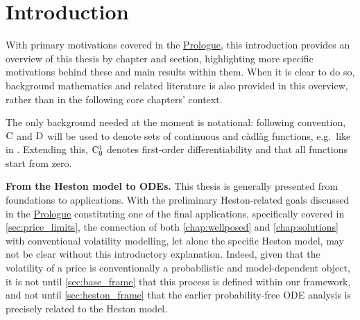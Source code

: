 \clearpage

\setlength{\headsep}{10mm}

\pagestyle{fancy}
\fancyhf{}
\renewcommand{\headrulewidth}{0pt}
\cfoot{\thepage}
\chead{\textsc{\nouppercase{\leftmark}}}

\section{Introduction}\label{ch:intro}

With primary motivations covered in the \hyperlink{prologue}{Prologue}, this introduction provides an overview of this thesis by chapter and section, highlighting more specific motivations behind these and main results within them. When it is clear to do so, background mathematics and related literature is also provided in this overview, rather than in the following core chapters' context.

The only background needed at the moment is notational: following convention, $\mathrm{C}$ and $\mathrm{D}$ will be used to denote sets of continuous and c\`adl\`ag functions, e.g.~like in \cite{billingsley_1999}. Extending this, $\mathrm{C}_0^1$ denotes first-order differentiability and that all functions start from zero.

\vspace{3mm}\textbf{From the Heston model to ODEs.} This thesis is generally presented from foundations to applications. With the preliminary Heston-related goals discussed in the \hyperlink{prologue}{Prologue} constituting one of the final applications, specifically covered in \autoref{sec:price_limits}, the connection of both \autoref{chap:wellposed} and \autoref{chap:solutions} with conventional volatility modelling, let alone the specific Heston model, may not be clear without this introductory explanation. Indeed, given that the volatility of a price is conventionally a probabilistic and model-dependent object, it is not until \autoref{sec:base_frame} that this process is defined within our framework, and not until \autoref{sec:heston_frame} that the earlier probability-free ODE analysis is precisely related to the Heston model.

